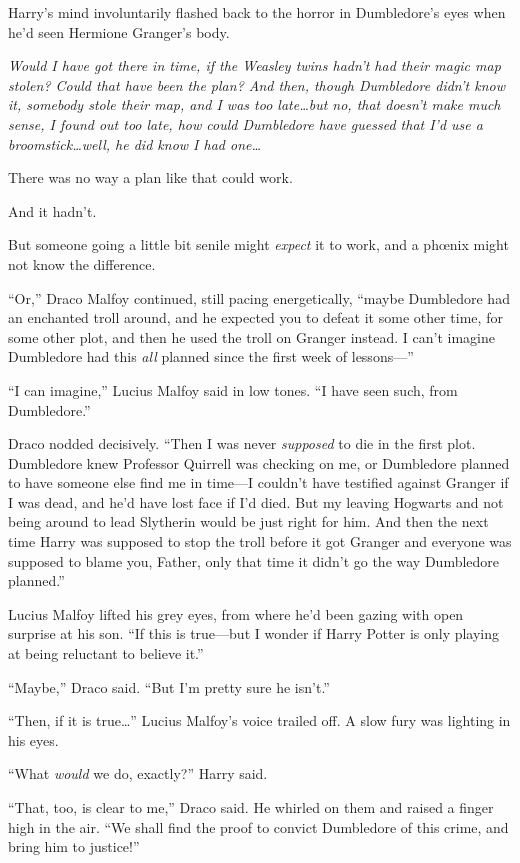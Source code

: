 Harry’s mind involuntarily flashed back to the horror in Dumbledore’s eyes when he’d seen Hermione Granger’s body.

\emph{Would I have got there in time, if the Weasley twins hadn’t had their magic map stolen? Could that have been the plan? And then, though Dumbledore didn’t know it, somebody stole their map, and I was too late…but no, that doesn’t make much sense, I found out too late, how could Dumbledore have guessed that I’d use a broomstick…well, he did know I had one…}

There was no way a plan like that could work.

And it hadn’t.

But someone going a little bit senile might \emph{expect} it to work, and a phœnix might not know the difference.

“Or,” Draco Malfoy continued, still pacing energetically, “maybe Dumbledore had an enchanted troll around, and he expected you to defeat it some other time, for some other plot, and then he used the troll on Granger instead. I can’t imagine Dumbledore had this \emph{all} planned since the first week of lessons—”

“I can imagine,” Lucius Malfoy said in low tones. “I have seen such, from Dumbledore.”

Draco nodded decisively. “Then I was never \emph{supposed} to die in the first plot. Dumbledore knew Professor Quirrell was checking on me, or Dumbledore planned to have someone else find me in time—I couldn’t have testified against Granger if I was dead, and he’d have lost face if I’d died. But my leaving Hogwarts and not being around to lead Slytherin would be just right for him. And then the next time Harry was supposed to stop the troll before it got Granger and everyone was supposed to blame you, Father, only that time it didn’t go the way Dumbledore planned.”

Lucius Malfoy lifted his grey eyes, from where he’d been gazing with open surprise at his son. “If this is true—but I wonder if Harry Potter is only playing at being reluctant to believe it.”

“Maybe,” Draco said. “But I’m pretty sure he isn’t.”

“Then, if it is true…” Lucius Malfoy’s voice trailed off. A slow fury was lighting in his eyes.

“What \emph{would} we do, exactly?” Harry said.

“That, too, is clear to me,” Draco said. He whirled on them and raised a finger high in the air. “We shall find the proof to convict Dumbledore of this crime, and bring him to justice!”

